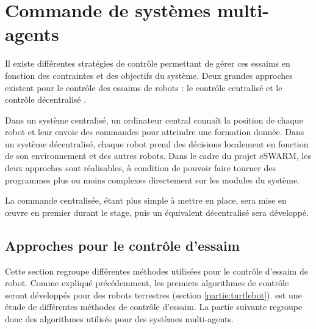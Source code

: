 \section{Commande de systèmes multi-agents}

Il existe différentes stratégies de contrôle permettant de gérer ces essaims en fonction des contraintes et des objectifs du système.
Deux grandes approches existent pour le contrôle des essaims de robots : le contrôle centralisé et le contrôle décentralisé \cite{jamshidpey_centralization_2024}.

Dans un système centralisé, un ordinateur central connaît la position de chaque robot et leur envoie des commandes pour atteindre une formation donnée. Dans un système décentralisé, chaque robot prend des décisions localement en fonction de son environnement et des autres robots. Dans le cadre du projet eSWARM, les deux approches sont réalisables, à condition de pouvoir faire tourner des programmes plus ou moins complexes directement sur les modules du système.

\begin{table}[h]
    \centering
    \caption{Comparaison du contrôle centralisé et décentralisé \cite{jamshidpey_centralization_2024}}
    \label{tab:comparaison_controle}
\end{table}

\noindent La commande centralisée, étant plus simple à mettre en place, sera mise en œuvre en premier durant le stage, puis un équivalent décentralisé sera développé. 

\subsection{Approches pour le contrôle d’essaim}

Cette section regroupe différentes méthodes utilisées pour le contrôle d'essaim de robot. Comme expliqué précédemment, les premiers algorithmes de contrôle seront développés pour des robots terrestres (section \ref{partie:turtlebot}). \cite{tsiu_survey_2020} est une étude de différentes méthodes de contrôle d'essaim. La partie suivante regroupe donc des algorithmes utilisés pour des systèmes multi-agents.


